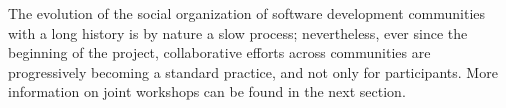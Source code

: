 The evolution of the social organization of software development
communities with a long history is by nature a slow process;
nevertheless, ever since the beginning of the project, collaborative
efforts across communities are progressively becoming a standard
practice, and not only for \ODK participants. More information on
joint workshops can be found in the next section.


